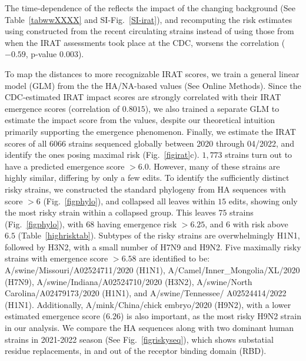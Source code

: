 \documentclass[onecolumn, compsoc,10pt]{IEEEtran}
\def\METHODS{Online Methods\xspace}
\begin{document}
% 

The time-dependence of the \erisk reflects the impact of the changing background (See Table~\ref{tabwwXXXX}  and SI-Fig.~\ref{SI-irat}), and recomputing the risk estimates using  constructed from the recent circulating strains instead of using those from when the IRAT assessments took place at the  CDC,  worsens the correlation ($-0.59$, p-value $0.003$).

To map the \enet distances to  more recognizable IRAT scores, we  train a general linear model (GLM)  from the  the HA/NA-based \erisk values (See \METHODS). Since the CDC-estimated IRAT impact scores are strongly correlated with their IRAT emergence scores (correlation of $0.8015$), we also trained a separate GLM to estimate the impact score from the \erisk values, despite our theoretical intuition primarily supporting the emergence phenomenon.  Finally,  we estimate the  IRAT scores of all  $6066$  \infl strains sequenced globally between 2020 through 04/2022, and identify the ones posing maximal risk (Fig.~\ref{figirat}c). $1,773$ strains turn out to have a predicted emergence score $>6.0$. However, many of these strains are highly similar, differing by only a few edits. To identify the sufficiently distinct risky strains, we constructed the standard phylogeny from  HA sequences with score $>6$ (Fig.~\ref{figphylo}), and collapsed all leaves within $15$ edits, showing only the most risky strain within a collapsed group. This leaves $75$ strains (Fig.~\ref{figphylo}), with $68$ having emergence risk $>6.25$, and $6$ with  risk above $6.5$ (Table~\ref{highrisktab}). Subtypes of the   risky strains are overwhelmingly H1N1, followed by H3N2, with a  small number of H7N9 and H9N2. Five maximally risky strains with emergence score $>6.58$ are identified to be: 
A/swine/Missouri/A02524711/2020 (H1N1), A/Camel/Inner\_Mongolia/XL/2020 (H7N9), A/swine/Indiana/A02524710/2020 (H3N2), A/swine/North Carolina/A02479173/2020 (H1N1), and A/swine/Tennessee/ A02524414/2022 (H1N1).  Additionally,  A/mink/China/chick embryo/2020 (H9N2),  with a lower estimated emergence score ($6.26$) is also important, as the most risky H9N2 strain in our analysis. We compare the HA sequences along with two dominant human strains in 2021-2022 season (See Fig.~\ref{figriskyseq}), which shows substatial residue replacements, in and out of the receptor binding domain (RBD).

\end{document}
